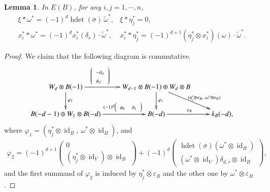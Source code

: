 \documentclass[a4paper,10pt]{amsart}
\newtheorem{lemma}[theorem]{Lemma}
\theoremstyle{definition}
\numberwithin{equation}{section}
\DeclareMathOperator{\id}{id}
\DeclareMathOperator{\hdet}{hdet}
\begin{document}
\begin{lemma}\label{lemma: E^1(B) E^d(B)}
In $E(B)$, for any $i,j=1,\cdots,n$,
$$
\begin{array}{ll}
 \xi\ast\omega^*=(-1)^d\hdet(\overline{\sigma})\,\widetilde{\omega}^*,&\xi\ast\eta_j^*=0,\\
x^*_i\ast\omega^*=(-1)^dx_i^*(\delta_r)\cdot\widetilde{\omega}^*, &x_i^*\ast\eta_j^*=(-1)^{d+1}(\eta_j^*\otimes x^*_i)(\omega)\cdot \widetilde{\omega}^*.
\end{array}
$$
\end{lemma}
\begin{proof}
We claim that the following diagram is commutative.
$$
\xymatrix{
 W_d\otimes B(-1)\ar[r]^(0.38){\left({\scriptscriptstyle\begin{array}{l}{\scriptstyle -\partial_d} \\ {\scriptstyle\phi_d}\end{array}}\right)}\ar[d]^{\varphi_2}
 &
 W_{d-1}\otimes B(-1)\oplus W_d\otimes B\ar[d]^{\varphi_1} \ar[rd]^(0.6){\,(\eta_j^*\otimes\varepsilon_B,\  \omega^*\otimes\varepsilon_B)}\\
B(-d-1)\oplus W_1\otimes B(-d)\ar[r]^(0.63){(-1)^d\left(\begin{array}{ll}{\scriptstyle \phi_0}& {\scriptstyle \partial_1}\end{array}\right)}
&
B(-d)\ar[r]^{\varepsilon_B}&
k_B(-d),
}
$$
where $\varphi_1=(\eta_j^*\otimes\id_B,\ \omega^*\otimes\id_B)$, and
\begin{align*}
\varphi_2=(-1)^{d+1}\left(\begin{array}{c}
0\\
(\eta_j^*\otimes\id_V)\otimes\id_B
\end{array}
\right)+(-1)^d\left(\begin{array}{c}
\hdet(\overline{\sigma})(\omega^*\otimes \id_B)\\
(\omega^*\otimes\id_V)\delta_{d,r}\otimes \id_B
\end{array}
\right),
\end{align*}
and the first summand of $\varphi_2$ is induced by $\eta_j^*\otimes\varepsilon_B$ and the other one by $\omega^*\otimes\varepsilon_B$.


\end{proof}
\end{document}
